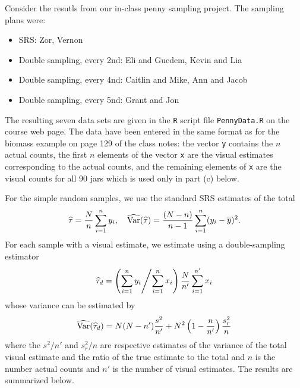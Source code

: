 \documentclass[usenames,dvipsnames]{homework}
\providecommand{\DIFadd}[1]{{\protect\color{blue}\uwave{#1}}} %
\providecommand{\DIFaddbegin}{} %
\providecommand{\DIFaddend}{} %
\begin{document}
\begin{longproblem} Consider the resutls from our in-class penny sampling project.  The sampling plans were:
  \begin{itemize}
    \item SRS: Zor, Vernon
    \item Double sampling, every 2nd: Eli and Guedem, Kevin and Lia \DIFaddbegin \DIFadd{TEST
    }\DIFaddend \item Double sampling, every 4nd: Caitlin and Mike, Ann and Jacob
    \item Double sampling, every 5nd: Grant and Jon
  \end{itemize}

  The resulting seven data sets are given in the \texttt{R} script file \texttt{PennyData.R} on the course web page.  The data have been entered in the same format as for the biomass example on page 129 of the class notes:  the vector \texttt{y} contains the $n$ actual counts, the first $n$ elements of the vector \texttt{x} are the visual estimates corresponding to the actual counts, and the remaining elements of \texttt{x} are the visual counts for all 90 jars which is used only in part (c) below.


\begin{solution}
For the simple random samples, we use the standard SRS estimates of the total
$$
\hat\tau = \frac Nn \sum_{i=1}^n y_i,\quad \hat{\Var}(\hat\tau) = \frac{(N-n)}{n-1}\sum_{i=1}^n (y_i - \bar y)^2.
$$
For each sample with a visual estimate, we estimate using a double-sampling estimator 
$$
\hat\tau_d = \left( \sum_{i=1}^n y_i \middle/ \sum_{i=1}^n x_i \right) \frac N{n'} \sum_{i=1}^{n'}x_i
$$
whose variance can be estimated by
$$
\hat{\Var}(\hat\tau_d)  = N(N-n')\frac {s^2}{n'} + N^2\left(1-\frac n{n'}\right) \frac{s_r^2}{n}
$$
where the $s^2/n'$ and $s_r^2/n$ are respective estimates of the variance of the total visual estimate and the ratio of the true estimate to the total and $n$ is the number actual counts and $n'$ is the number of visual estimates. The results are summarized below.


\end{solution}
\end{longproblem}
\end{document}
